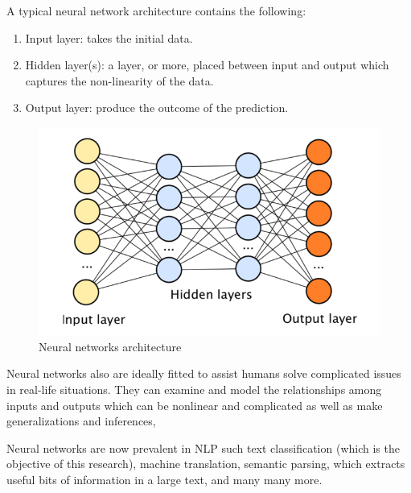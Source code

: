 \documentclass[12pt]{diazessay}
\begin{document}
        A typical neural network architecture contains the following:
        \begin{enumerate}
            \item Input layer: takes the initial data.
            \item Hidden layer(s): a layer, or more, placed between input and output which captures the non-linearity of the data.
            \item Output layer: produce the outcome of the prediction.
        \end{enumerate}
        
        \begin{figure}[h]
            \centering
            \includegraphics[scale=0.5]{Figures/neural networks.png}
            \caption{Neural networks architecture \cite{marcus2018deep}}
            \label{fig:cmp}
        \end{figure}
        
        Neural networks also are ideally fitted to assist humans solve complicated issues in real-life situations. They can examine and model the relationships among inputs and outputs which can be nonlinear and complicated as well as make generalizations and inferences,
        
        
        Neural networks are now prevalent in NLP such text classification (which is the objective of this research), machine translation, semantic parsing, which extracts useful bits of information in a large text, and many many more.
        
\end{document}
